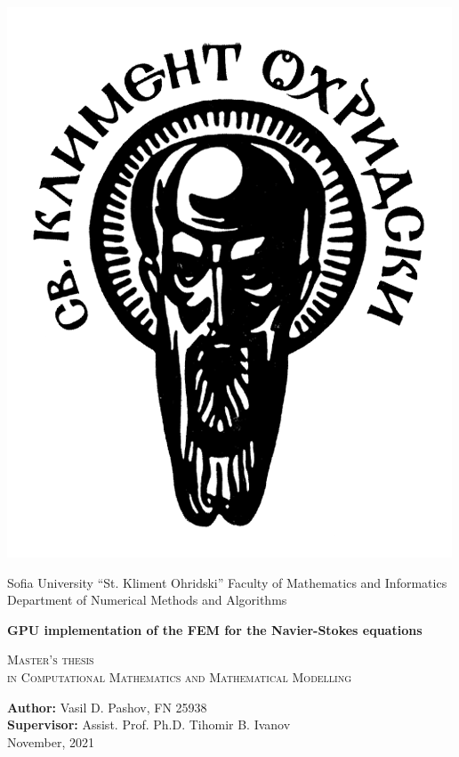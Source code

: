 \documentclass[12pt]{report}
\begin{document}
\begin{titlepage}
\begin{center}
\begin{minipage}{0.45\textwidth}
	\includegraphics[scale=0.2]{Figures/2_SU_bg_n.png}
\end{minipage}
\begin{minipage}{0.45\textwidth}
	\footnotesize
	Sofia University ``St. Kliment Ohridski'' Faculty of Mathematics and Informatics\\
	\vfill
	Department of Numerical Methods and Algorithms
\end{minipage}

\vspace{1.5cm}

\textbf{\Large GPU implementation of the FEM for the Navier-Stokes equations}

\vspace{1.5cm}
\small
\textsc{Master's thesis}\\
\textsc{in Computational Mathematics and Mathematical Modelling}
\vfill

\textbf{Author:} Vasil D. Pashov, FN 25938\\
\textbf{Supervisor:} Assist. Prof. Ph.D. Tihomir B. Ivanov\\
\vfill
November, 2021


\end{center}
\end{titlepage}
\end{document}
